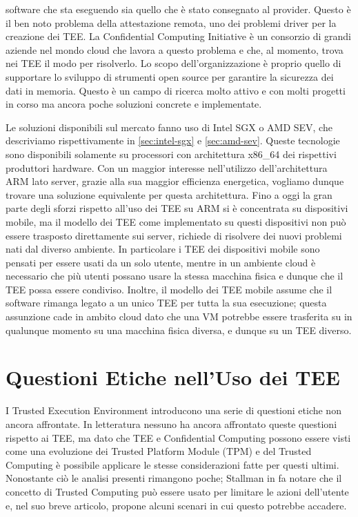 \documentclass[12pt,italian]{report}
\begin{document}
software che sta eseguendo sia quello che è stato consegnato al provider.
Questo è il ben noto problema della attestazione remota, uno dei problemi
driver per la creazione dei TEE. %
La Confidential Computing Initiative\cite{confidential-computing-initiative}
è un consorzio di grandi aziende nel mondo cloud che lavora a questo problema
e che, al momento, trova nei TEE il modo per risolverlo.
Lo scopo dell'organizzazione è proprio quello di supportare lo sviluppo
di strumenti open source per garantire la sicurezza dei dati in memoria.
Questo è un campo di ricerca molto attivo e con molti progetti in corso ma
ancora poche soluzioni concrete e implementate.

Le soluzioni disponibili sul mercato fanno uso di Intel SGX
o AMD SEV, che descriviamo rispettivamente in \ref{sec:intel-sgx} e
\ref{sec:amd-sev}. Queste tecnologie sono disponibili solamente su processori
con architettura x86\_64 dei rispettivi produttori hardware.
Con un maggior interesse nell'utilizzo dell'architettura ARM lato server, %
grazie alla sua maggior efficienza energetica, %
vogliamo dunque trovare una soluzione equivalente per questa architettura.
Fino a oggi la gran parte degli sforzi rispetto all'uso dei TEE su ARM
si è concentrata su dispositivi mobile, ma il modello dei TEE come implementato
su questi dispositivi non può essere trasposto direttamente sui server,
richiede di risolvere dei nuovi problemi nati dal diverso ambiente.
In particolare i TEE dei dispositivi mobile sono pensati per essere usati
da un solo utente, mentre in un ambiente cloud è necessario che più utenti
possano usare la stessa macchina fisica e dunque che il TEE possa essere
condiviso.
Inoltre, il modello dei TEE mobile assume che il software rimanga legato a
un unico TEE per tutta la sua esecuzione; questa assunzione cade in ambito
cloud dato che una VM potrebbe essere trasferita su in qualunque momento su
una macchina fisica diversa, e dunque su un TEE diverso.

\section{Questioni Etiche nell'Uso dei TEE}
\label{sec:etica-tee}
I Trusted Execution Environment introducono una serie di questioni etiche
non ancora affrontate.
In letteratura nessuno ha ancora affrontato queste questioni rispetto ai TEE,
ma dato che TEE e Confidential Computing possono essere visti come una
evoluzione dei Trusted Platform Module (TPM) e del Trusted Computing 
è possibile applicare le stesse considerazioni fatte per questi ultimi.
Nonostante ciò le analisi presenti rimangono poche; Stallman in
\cite{stallman2021tpm} fa notare che il concetto di Trusted Computing può
essere usato per limitare le azioni dell'utente e, nel suo breve articolo,
propone alcuni scenari in cui questo potrebbe accadere. 
\end{document}
